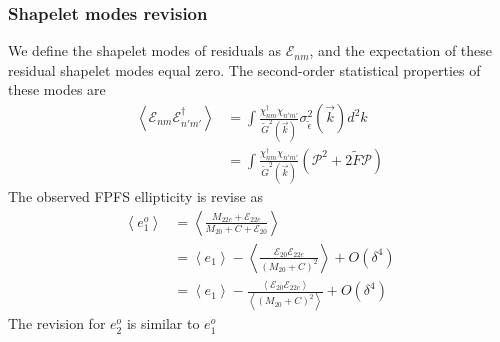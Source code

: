 \subsubsection{Shapelet modes revision}
We define the shapelet modes of residuals as $\mathcal{E}_{nm}$, and the
expectation of these residual shapelet modes equal zero. The second-order
statistical properties of these modes are
\begin{equation}
    \begin{split}
    \left\langle \mathcal{E}_{nm}\mathcal{E}^{\dagger}_{n'm'} \right\rangle
    &=\int \frac{\chi^\dagger_{nm}\chi_{n'm'}}{\tilde{G}^2(\vec{k})}
    \sigma^2_{\tilde{\epsilon}}(\vec{k})d^2k\\
    &=\int \frac{\chi^\dagger_{nm}\chi_{n'm'}}{\tilde{G}^2(\vec{k})}
    \left(\mathcal{P}^2+2\tilde{F}\mathcal{P}\right)
    \end{split}
\end{equation}
The observed FPFS ellipticity is revise as
\begin{equation}
    \begin{split}
    \left\langle e^o_1\right\rangle
    &=\left\langle\frac{M_{22c}+\mathcal{E}_{22c}}
        {M_{20}+C+\mathcal{E}_{20}}\right\rangle\\
    &=\left\langle e_1\right\rangle
        -\left\langle\frac{\mathcal{E}_{20}\mathcal{E}_{22c}}
        {(M_{20}+C)^2}\right\rangle
        + O(\delta^4)\\
    &=\left\langle e_1\right\rangle
        -\frac{\left\langle\mathcal{E}_{20}\mathcal{E}_{22c}\right\rangle}
        {\left\langle(M_{20}+C)^2\right\rangle}
        + O(\delta^4)
    \end{split}
\end{equation}
The revision for $e^o_2$ is similar to $e^o_1$

